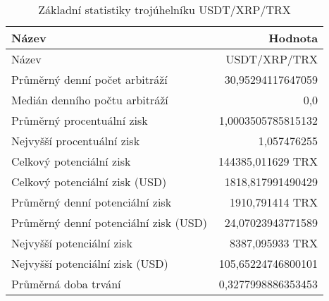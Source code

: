 \begin{table}\centering
\caption{Základní statistiky trojúhelníku USDT/XRP/TRX}
\label{USDTXRPTRX_stats}
\begin{tabular}{|| l | r ||}
\hline Název & Hodnota \\ 
\hline\hline Název & USDT/XRP/TRX \\ 
\hline Průměrný denní počet arbitráží & 30,95294117647059 \\ 
\hline Medián denního počtu arbitráží & 0,0 \\ 
\hline Průměrný procentuální zisk & 1,0003505785815132 \\ 
\hline Nejvyšší procentuální zisk & 1,057476255 \\ 
\hline Celkový potenciální zisk & 144385,011629 TRX \\ 
\hline Celkový potenciální zisk (USD) & 1818,817991490429 \\ 
\hline Průměrný denní potenciální zisk & 1910,791414 TRX \\ 
\hline Průměrný denní potenciální zisk (USD) & 24,07023943771589 \\ 
\hline Nejvyšší potenciální zisk & 8387,095933 TRX \\ 
\hline Nejvyšší potenciální zisk (USD) & 105,65224746800101 \\ 
\hline Průměrná doba trvání & 0,3277998886353453 \\ 
\hline
\end{tabular}
\end{table}